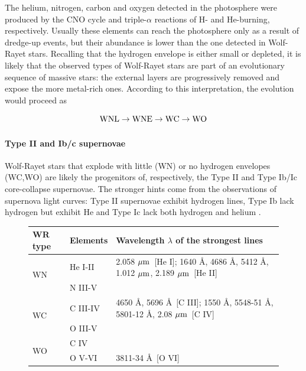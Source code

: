 \documentclass[a4paper,titlepage]{book}     	%
\begin{document}
The helium, nitrogen, carbon and oxygen detected in the photosphere were produced by the CNO cycle and triple-$\alpha$ reactions of H- and He-burning, respectively. Usually these elements can reach the photosphere only as a result of dredge-up events, but their abundance is lower than the one detected in Wolf-Rayet stars. Recalling that the hydrogen envelope is either small or depleted, it is likely that the observed types of Wolf-Rayet stars are part of an evolutionary sequence of massive stars: the external layers are progressively removed and expose the more metal-rich ones. According to this interpretation, the evolution would proceed as

\[\rm WNL \rightarrow WNE \rightarrow WC \rightarrow WO\]

\paragraph{Type II and Ib/c supernovae} Wolf-Rayet stars that explode with little (WN) or no hydrogen envelopes (WC,WO) are likely the progenitors of, respectively, the Type II and Type Ib/Ic core-collapse supernovae. The stronger hints come from the observations of supernova light curves: Type II supernovae exhibit hydrogen lines, Type Ib lack hydrogen but exhibit He and Type Ic lack both hydrogen and helium \cite{WR_signature,parsec2015_chen,Limongi2010_preSNevo}.


\renewcommand{\arraystretch}{1.5}
\begin{figure}[h]
	\centering
		\begin{tabular}{lll}
			\toprule
			WR type & Elements & Wavelength $\lambda$ of the strongest lines \\
			\midrule
			\multirow{2}{*}{WN}  & He I-II  & 2.058 $\mu\rm m$~[He I]; 1640 \AA , 4686 \AA, 5412 \AA, 1.012 $\mu\rm m$, 2.189 $\mu\rm m$~[He II]  \\
			& N III-V & \\ 
			\hline
			\multirow{2}{*}{WC}  & C III-IV  & 4650 \AA, 5696 \AA ~[C III]; 1550 \AA,  5548-51 \AA, 5801-12 \AA, 2.08 $\mu\rm m$~[C IV] \\
			& O III-V & \\
			\hline
			\multirow{2}{*}{WO}  & C IV  &\\
			& O V-VI & 3811-34 \AA~[O VI]\\
			\bottomrule 	
		\end{tabular}
		 \label{tab:WRclassification}
\end{figure}
\end{document}
